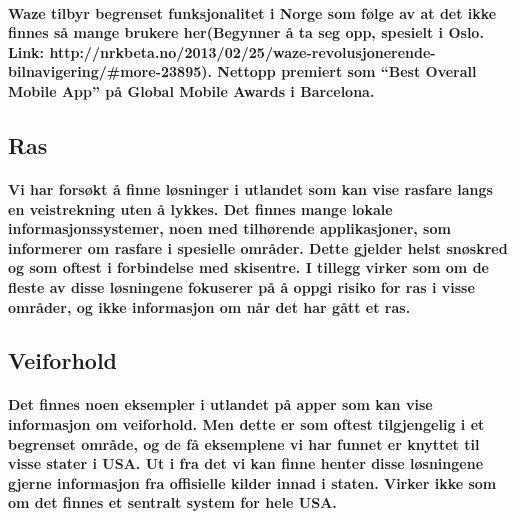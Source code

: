 \paragraph{Waze tilbyr begrenset funksjonalitet i Norge som følge av at det ikke finnes så mange brukere her(Begynner å ta seg opp, spesielt i Oslo. Link: http://nrkbeta.no/2013/02/25/waze-revolusjonerende-bilnavigering/#more-23895).
Nettopp premiert som “Best Overall Mobile App” på Global Mobile Awards i Barcelona.}


\subsection{Ras}
\paragraph{Vi har forsøkt å finne løsninger i utlandet som kan vise rasfare langs en veistrekning uten å lykkes. Det finnes mange lokale informasjonssystemer, noen med tilhørende applikasjoner, som informerer om rasfare i spesielle områder. Dette gjelder helst snøskred og som oftest i forbindelse med skisentre. I tillegg virker som om de fleste av disse løsningene fokuserer på å oppgi risiko for ras i visse områder, og ikke informasjon om når det har gått et ras.}

\subsection{Veiforhold}
\paragraph{Det finnes noen eksempler i utlandet på apper som kan vise informasjon om veiforhold. Men dette er som oftest tilgjengelig i et begrenset område, og de få eksemplene vi har funnet er knyttet til visse stater i USA. Ut i fra det vi kan finne henter disse løsningene gjerne informasjon fra offisielle kilder innad i staten. Virker ikke som om det finnes et sentralt system for hele USA.}




